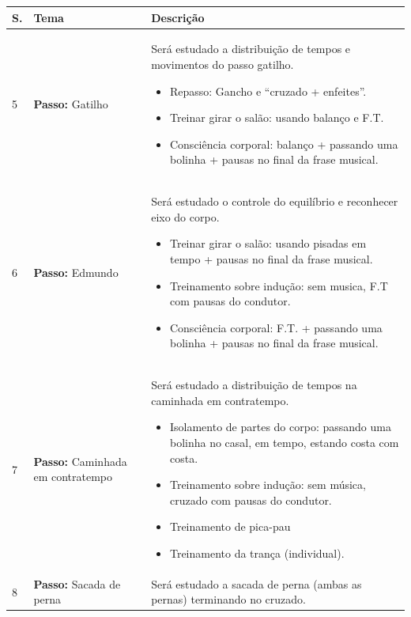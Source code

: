 \documentclass[12pt, a4paper]{article}
\begin{document}
\newpage
\begin{longtable}{|p{0.5cm}|p{3.0cm}|p{12.0cm}|}
\hline
S. & Tema & Descrição \\  \hline \hline            
5 &  \textbf{Passo:} Gatilho &  Será estudado a distribuição de tempos e movimentos do passo gatilho.
        \begin{itemize}
        \item Repasso: Gancho e ``cruzado + enfeites''.
        \item Treinar girar o salão: usando balanço e F.T.
        \item Consciência corporal: balanço + passando uma bolinha + pausas no final da frase musical.
        \end{itemize}
        \\ \hline 
6 &  \textbf{Passo:} Edmundo &  Será estudado o controle do equilíbrio e reconhecer eixo do corpo. 
        \begin{itemize}
        \item Treinar girar o salão: usando pisadas em tempo + pausas no final da frase musical.
        \item Treinamento sobre indução: sem musica, F.T com pausas do condutor.
        \item Consciência corporal: F.T. + passando uma bolinha + pausas no final da frase musical.
        \end{itemize}
        \\ \hline 
7 &  \textbf{Passo:} Caminhada em contratempo & Será estudado a distribuição de tempos na caminhada em contratempo. 
        \begin{itemize}
        \item Isolamento de partes do corpo: passando uma bolinha no casal, em tempo, estando costa com costa.
        \item Treinamento sobre indução: sem música, cruzado com pausas do condutor.
        \item Treinamento de pica-pau
        \item Treinamento da trança (individual).
        \end{itemize}
        \\ \hline 
8 &  \textbf{Passo:} Sacada de perna & Será estudado a sacada de perna (ambas as pernas) terminando no cruzado. 

\end{longtable}
\end{document}
